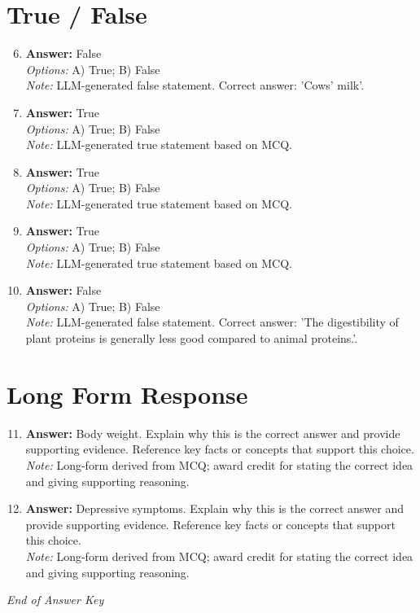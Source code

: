 \documentclass[12pt]{article}
\begin{document}
\section*{True / False}
\begin{enumerate}[label=\arabic*.]
\setcounter{enumi}{5}
\item \textbf{Answer:} False
\\ \textit{Options:} A) True; B) False
\\ \textit{Note:} LLM-generated false statement. Correct answer: 'Cows' milk'.
\item \textbf{Answer:} True
\\ \textit{Options:} A) True; B) False
\\ \textit{Note:} LLM-generated true statement based on MCQ.
\item \textbf{Answer:} True
\\ \textit{Options:} A) True; B) False
\\ \textit{Note:} LLM-generated true statement based on MCQ.
\item \textbf{Answer:} True
\\ \textit{Options:} A) True; B) False
\\ \textit{Note:} LLM-generated true statement based on MCQ.
\item \textbf{Answer:} False
\\ \textit{Options:} A) True; B) False
\\ \textit{Note:} LLM-generated false statement. Correct answer: 'The digestibility of plant proteins is generally less good compared to animal proteins.'.
\end{enumerate}

\section*{Long Form Response}
\begin{enumerate}[label=\arabic*.]
\setcounter{enumi}{10}
\item \textbf{Answer:} Body weight. Explain why this is the correct answer and provide supporting evidence. Reference key facts or concepts that support this choice.
\\ \textit{Note:} Long-form derived from MCQ; award credit for stating the correct idea and giving supporting reasoning.
\item \textbf{Answer:} Depressive symptoms. Explain why this is the correct answer and provide supporting evidence. Reference key facts or concepts that support this choice.
\\ \textit{Note:} Long-form derived from MCQ; award credit for stating the correct idea and giving supporting reasoning.
\end{enumerate}

\vfill
\noindent\textit{End of Answer Key}
\end{document}
